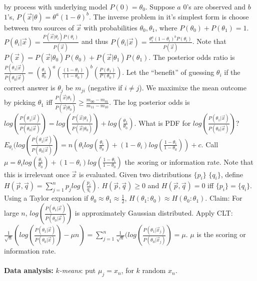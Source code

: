 by process with underlying model $P(0)= \theta_0$.  Suppose $a$ $0$'s are observed and $b$ $1$'s,
$P({\vec x}| \theta) = \theta^a (1-\theta)^b$.  The inverse problem in it's simplest form is
choose between two sources of ${\vec x}$ with probabilities $\theta_0 , \theta_1$, where
$P(\theta_0)+P(\theta_1)=1$.  
$P(\theta_i | {\vec x})= {\frac {P({\vec x} | \theta_i) P(\theta_i)} {P({\vec x})}}$ and thus
$P(\theta_i | {\vec x})= {\frac {\theta_i^a (1- \theta_i)^b P(\theta_i)} {P({\vec x})}}$.
Note that
$P({\vec x})= P({\vec x}|\theta_0) P(\theta_0)+ P({\vec x}|\theta_1) P(\theta_1)$.
The posterior odds ratio is
${\frac {P(\theta_1|{\vec x})} {P(\theta_0|{\vec x})}}=
({\frac {\theta_1} {\theta_0}})^a 
({\frac {(1-\theta_1)} {(1-\theta_0)}})^b 
({\frac {P(\theta_1)} {P(\theta_0)}})$.  Let the ``benefit'' of guessing $\theta_i$ if the
correct answer is $\theta_j$ be $m_{ji}$ (negative if $i \ne j$).  We maximixe 
the mean outcome by picking $\theta_1$ iff 
${\frac {P({\vec x}|\theta_1)} {P({\vec x}|\theta_0)} } \ge {\frac {m_{00}-m_{01}} {m_{11}-m_{10}}}$.
The log posterior odds is
$log({\frac {P(\theta_1|{\vec x})} {P(\theta_0|{\vec x})}})=
log({\frac {P({\vec x}|\theta_1)} {P({\vec x}|\theta_0)}})+
log({\frac {\theta_1} {\theta_0}})
$.  What is PDF for
$log({\frac {P(\theta_1|{\vec x})} {P(\theta_0|{\vec x})}})$?
$E_{\theta_i}(
log({\frac {P(\theta_1|{\vec x})} {P(\theta_0|{\vec x})}})
= n( \theta_i log({\frac {\theta_i} {\theta_0}}) + 
(1-\theta_i)
log({\frac {1-\theta_i} {1-\theta_0}})) + c$. 
Call $\mu= \theta_i log({\frac {\theta_i} {\theta_0}}) + (1-\theta_i)
log({\frac {1-\theta_i} {1-\theta_0}})
$ the {\emph scoring or information rate}.  Note that this is irrelevant once ${\vec x}$ is
evaluated.
Given two distributions 
$\{p_i \}$
$\{q_i \}$, define $H({\vec p}, {\vec q})= \sum_{j=1}^n p_j log({\frac {p_i} {q_i}})$.
$H({\vec p}, {\vec q}) \ge 0$ and
$H({\vec p}, {\vec q}) = 0$ iff 
$\{p_i \}= \{q_i \}$.  
Using a Taylor expansion if $\theta_0 \approx \theta_1 \approx {\frac 1 2}$,
$ H(\theta_1:\theta_0) \approx H(\theta_0:\theta_1)$.
Claim: For large $n$, 
$log({\frac {P(\theta_1|{\vec x})} {P(\theta_0|{\vec x})}})$ is approximately 
Gaussian distributed.  Apply CLT:
$
{\frac 1 {\sqrt n}} (log({\frac {P(\theta_1|{\vec x})} {P(\theta_0|{\vec x})}})- \mu n)=
\sum_{j=1}^n {\frac 1 {\sqrt n}} (log({\frac {P(\theta_1|{\vec x}_j)} {P(\theta_0|{\vec x}_j)}})= \mu$.
$\mu$ is the scoring or information rate.
\\
\\
{\bf Data analysis:} \emph{$k$-means}: put $\mu_j=x_n$, for $k$ random $x_n$.  
